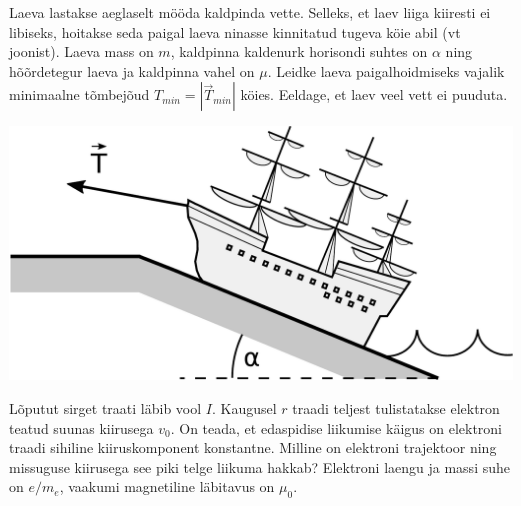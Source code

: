 \documentclass[10pt]{article}
\begin{document}

Laeva lastakse aeglaselt mööda kaldpinda vette. Selleks, et laev liiga kiiresti ei libiseks, hoitakse seda paigal laeva ninasse kinnitatud tugeva köie abil (vt joonist). Laeva mass on $m$,  kaldpinna kaldenurk horisondi suhtes on $\alpha$ ning hõõrdetegur laeva ja kaldpinna vahel on $\mu$. Leidke laeva paigalhoidmiseks vajalik minimaalne tõmbejõud $T_{min}=|\overrightarrow{T}_{min}|$ köies. Eeldage, et laev veel vett ei puuduta.
\begin{center}
	\includegraphics[width=0.4\linewidth]{2021-v2g-10-yl.pdf}
\end{center}
\probend
\bigskip


Lõputut sirget traati läbib vool $I$. Kaugusel $r$ traadi teljest tulistatakse elektron teatud suunas kiirusega $v_0$. On teada, et edaspidise liikumise käigus on elektroni traadi sihiline kiiruskomponent konstantne. Milline on elektroni trajektoor ning missuguse kiirusega see piki telge liikuma hakkab? Elektroni laengu ja massi suhe on $e/m_e$, vaakumi magnetiline läbitavus on $\mu_0$.
\probend
\bigskip

\end{document}
